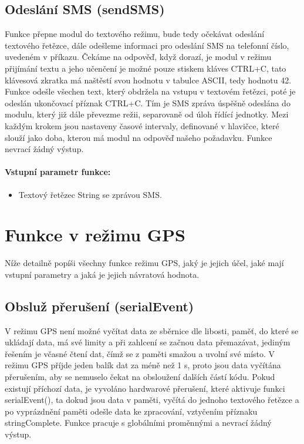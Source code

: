 \documentclass[FM,BP]{tulthesis}  %
\begin{document}
\subsection{Odeslání SMS (sendSMS)}
Funkce přepne modul do textového režimu, bude tedy očekávat odeslání textového řetězce, dále odešleme informaci pro odeslání SMS na telefonní číslo, uvedeném v příkazu. Čekáme na odpověď, když dorazí, je modul v režimu přijímání textu a jeho učenčení je možné pouze stiskem kláves CTRL+C, tato klávesová zkratka má naštěstí svou hodnotu v tabulce ASCII, tedy hodnotu 42. Funkce odešle všechen text, který obdržela na vstupu v textovém řetězci, poté je odeslán ukončovací příznak CTRL+C. Tím je SMS zpráva úspěšně odeslána do modulu, který již dále převezme režii, separovaně od úloh řídící jednotky. Mezi každým krokem jsou nastaveny časové intervaly, definované v hlavičce, které slouží jako doba, kterou má modul na odpověď našeho požadavku. Funkce nevrací žádný výstup.

\paragraph{Vstupní parametr funkce:}
\begin{itemize}
\item Textový řetězec String se zprávou SMS.
\end{itemize}


\section{Funkce v režimu GPS}
Níže detailně popíši všechny funkce režimu GPS, jaký je jejich účel, jaké mají vstupní parametry a jaká je jejich návratová hodnota.

\subsection{Obsluž přerušení (serialEvent)}
V režimu GPS není možné vyčítat data ze sběrnice dle libosti, paměť, do které se ukládají data, má své limity a při zahlcení se začnou data přemazávat, jediným řešením je včasné čtení dat, čímž se z paměti smažou a uvolní své místo. V režimu GPS příjde jeden balík dat za méně než 1 s, proto jsou data vyčítána přerušením, aby se nemuselo čekat na obsloužení dalších částí kódu. Pokud existují příchozí data, je vyvoláno hardwarové přerušení, které aktivuje funkci serialEvent(), ta dokud jsou data v paměti, vyčítá do jednoho textového řetězce a po vyprázdnění paměti odešle data ke zpracování, vztyčením příznaku stringComplete. Funkce pracuje s globálními proměnnými a nevrací žádný výstup.
\end{document}
